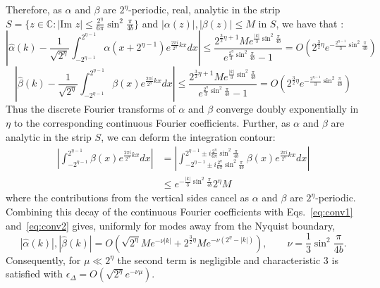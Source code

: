 \documentclass[aps,floatfix,10pt,amssymb,amsfont,amsmath,superscriptaddress,float,nofootinbib,longbibliography,nobalancelastpage,twocolumn]{revtex4-2}
\begin{document}
Therefore, as $\alpha$ and $\beta$ are $2^{\eta}$-periodic, real, analytic in the strip $S =\{z \in \mathbb{C}: |\text{Im } z| \leq \frac{2^{\eta}}{6\pi}\sin^2\frac{\pi}{4b}\}$ and $|\alpha(z)|, |\beta(z)| \leq M$ in $S$, we have that \cite{trefethen2014exponentially}:
\begin{equation}
\label{eq:conv1}
    \left|\hat\alpha(k) - \frac{1}{\sqrt{2^{\eta}}}\int_{-2^{\eta-1}}^{2^{\eta-1}}\alpha(x+2^{\eta-1})e^{\frac{2\pi i}{2^{\eta}}kx} dx\right| \leq \frac{2^{\frac{3}{2}\eta+1} Me^{\frac{|k|}{3}\sin^2 \frac{\pi}{4b}}}{e^{\frac{2^{\eta}}{3}\sin^2 \frac{\pi}{4b}}-1} = O(2^{\frac{3}{2}\eta}e^{-\frac{2^{\eta-1}}{3}\sin^2 \frac{\pi}{4b}})
\end{equation}
\begin{equation}
\label{eq:conv2}
    \left|\hat\beta(k) - \frac{1}{\sqrt{2^{\eta}}}\int_{-2^{\eta-1}}^{2^{\eta-1}}\beta(x)e^{\frac{2\pi i}{2^{\eta}}kx} dx\right| \leq  \frac{2^{\frac{3}{2}\eta+1}Me^{\frac{|k|}{3}\sin^2 \frac{\pi}{4b}}}{e^{\frac{2^{\eta}}{3}\sin^2 \frac{\pi}{4b}}-1}= O(2^{\frac{3}{2}\eta}e^{-\frac{2^{\eta-1}}{3}\sin^2 \frac{\pi}{4b}})
\end{equation}
Thus the discrete Fourier transforms of $\alpha$ and $\beta$ converge doubly exponentially in $\eta$ to the corresponding continuous Fourier coefficients. Further, as $\alpha$ and $\beta$ are analytic in the strip $S$, we can deform the integration contour:
\begin{align}
    \left|\int_{-2^{\eta-1}}^{2^{\eta-1}}\beta(x)e^{\frac{2\pi i}{2^{\eta}}kx} dx\right| &=\left| \int_{-2^{\eta-1}\pm i\frac{2^{\eta}}{6\pi}\sin^2\frac{\pi}{4b}}^{2^{\eta-1}\pm i\frac{2^{\eta}}{6\pi}\sin^2\frac{\pi}{4b}}\beta(x)e^{\frac{2\pi i}{2^{\eta}}kx} dx\right|\\
    &\leq e^{-\frac{|k|}{3}\sin^2 \frac{\pi}{4b}}2^{\eta}M
    \label{eq:tails}
\end{align}
where the contributions from the vertical sides cancel as $\alpha$ and $\beta$ are $2^{\eta}$-periodic. Combining this decay of the continuous Fourier coefficients with Eqs.~\eqref{eq:conv1} and~\eqref{eq:conv2} gives, uniformly for modes away from the Nyquist boundary,
\begin{equation}
\label{eq:exactdecay}
    |\hat \alpha(k)|, |\hat \beta(k)| = O\!\left(\sqrt{2^{\eta}}M e^{-\nu|k|}
    +2^{\frac{3}{2}\eta}M e^{-\nu(2^{\eta}-|k|)}\right),
    \qquad \nu=\frac13\sin^2\frac{\pi}{4b}.
\end{equation}
Consequently, for $\mu\ll 2^{\eta}$ the second term is negligible and characteristic 3 is satisfied with $\epsilon_{\Delta}=O(\sqrt{2^{\eta}}e^{-\nu\mu})$.
\end{document}
